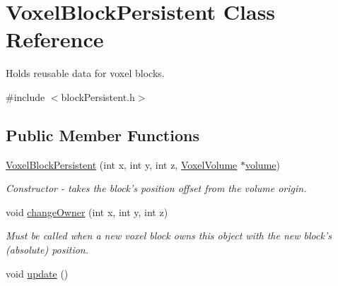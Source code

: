 \hypertarget{classVoxelBlockPersistent}{
\section{\-Voxel\-Block\-Persistent \-Class \-Reference}
\label{dd/d36/classVoxelBlockPersistent}
}


\-Holds reusable data for voxel blocks.  




{\ttfamily \#include $<$block\-Persistent.\-h$>$}

\subsection*{\-Public \-Member \-Functions}
\begin{DoxyCompactItemize}
\item 
\hypertarget{classVoxelBlockPersistent_abda9d0adcde5d20fa34c79ca714dda02}{
\hyperlink{classVoxelBlockPersistent_abda9d0adcde5d20fa34c79ca714dda02}{\-Voxel\-Block\-Persistent} (int x, int y, int z, \hyperlink{classVoxelVolume}{\-Voxel\-Volume} $\ast$\hyperlink{classVoxelBlockPersistent_a35ad2d41377b5e9a63718f5366c52cc7}{volume})}
\label{dd/d36/classVoxelBlockPersistent_abda9d0adcde5d20fa34c79ca714dda02}

\begin{DoxyCompactList}\small\item\em \-Constructor -\/ takes the block's position offset from the volume origin. \end{DoxyCompactList}\item 
\hypertarget{classVoxelBlockPersistent_a738535d09213bac1740ecffccbcbaefd}{
void \hyperlink{classVoxelBlockPersistent_a738535d09213bac1740ecffccbcbaefd}{change\-Owner} (int x, int y, int z)}
\label{dd/d36/classVoxelBlockPersistent_a738535d09213bac1740ecffccbcbaefd}

\begin{DoxyCompactList}\small\item\em \-Must be called when a new voxel block owns this object with the new block's (absolute) position. \end{DoxyCompactList}\item 
\hypertarget{classVoxelBlockPersistent_a0288c10edfdaacabaf0aa3423b991ec8}{
void \hyperlink{classVoxelBlockPersistent_a0288c10edfdaacabaf0aa3423b991ec8}{update} ()}
\label{dd/d36/classVoxelBlockPersistent_a0288c10edfdaacabaf0aa3423b991ec8}


\end{DoxyCompactItemize}
